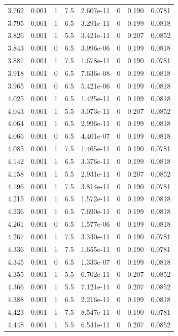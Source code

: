 \documentclass[preview]{standalone}
\begin{document}
{{{\begin{tabular}{L{1.2cm}C{1.2cm} C{0.3cm}C{0.5cm} C{1.4cm}C{1.4cm} C{1.4cm}C{1.4cm}}
  3.762  &  0.001  & 1     & 7.5 &  2.607e-11  & 0  & 0.190 &  0.0781   \\ 
  3.795  &  0.001  & 1     & 6.5 &  3.291e-11  & 0  & 0.199 &  0.0818   \\ 
  3.826  &  0.001  & 1     & 5.5 &  3.421e-11  & 0  & 0.207 &  0.0852   \\ 
  3.843  &  0.001  & 0     & 6.5 &  3.996e-06  & 0  & 0.199 &  0.0818   \\ 
  3.887  &  0.001  & 1     & 7.5 &  1.678e-11  & 0  & 0.190 &  0.0781   \\ 
  3.918  &  0.001  & 0     & 6.5 &  7.636e-08  & 0  & 0.199 &  0.0818   \\ 
  3.965  &  0.001  & 0     & 6.5 &  5.421e-06  & 0  & 0.199 &  0.0818   \\ 
  4.025  &  0.001  & 1     & 6.5 &  1.425e-11  & 0  & 0.199 &  0.0818   \\ 
  4.043  &  0.001  & 1     & 5.5 &  3.073e-11  & 0  & 0.207 &  0.0852   \\ 
  4.064  &  0.001  & 1     & 6.5 &  2.996e-11  & 0  & 0.199 &  0.0818   \\ 
  4.066  &  0.001  & 0     & 6.5 &  4.401e-07  & 0  & 0.199 &  0.0818   \\ 
  4.085  &  0.001  & 1     & 7.5 &  1.465e-11  & 0  & 0.190 &  0.0781   \\ 
  4.142  &  0.001  & 1     & 6.5 &  3.376e-11  & 0  & 0.199 &  0.0818   \\ 
  4.158  &  0.001  & 1     & 5.5 &  2.931e-11  & 0  & 0.207 &  0.0852   \\ 
  4.196  &  0.001  & 1     & 7.5 &  3.814e-11  & 0  & 0.190 &  0.0781   \\ 
  4.215  &  0.001  & 1     & 6.5 &  1.572e-11  & 0  & 0.199 &  0.0818   \\ 
  4.236  &  0.001  & 1     & 6.5 &  7.690e-11  & 0  & 0.199 &  0.0818   \\ 
  4.261  &  0.001  & 0     & 6.5 &  1.577e-06  & 0  & 0.199 &  0.0818   \\ 
  4.267  &  0.001  & 1     & 7.5 &  3.340e-11  & 0  & 0.190 &  0.0781   \\ 
  4.336  &  0.001  & 1     & 7.5 &  1.655e-11  & 0  & 0.190 &  0.0781   \\ 
  4.345  &  0.001  & 0     & 6.5 &  1.333e-07  & 0  & 0.199 &  0.0818   \\ 
  4.355  &  0.001  & 1     & 5.5 &  6.702e-11  & 0  & 0.207 &  0.0852   \\ 
  4.366  &  0.001  & 1     & 5.5 &  7.121e-11  & 0  & 0.207 &  0.0852   \\ 
  4.388  &  0.001  & 1     & 6.5 &  2.216e-11  & 0  & 0.199 &  0.0818   \\ 
  4.423  &  0.001  & 1     & 7.5 &  8.547e-11  & 0  & 0.190 &  0.0781   \\ 
  4.448  &  0.001  & 1     & 5.5 &  6.541e-11  & 0  & 0.207 &  0.0852   \\ 
\hline 
\end{tabular} 

}}}
\end{document}

